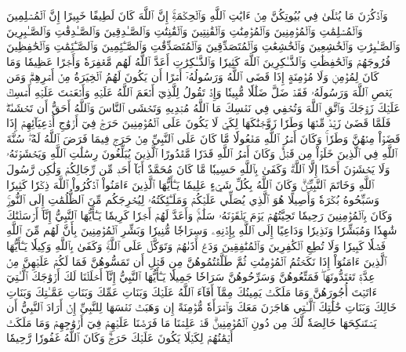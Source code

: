 وَٱذۡكُرۡنَ مَا يُتۡلَىٰ فِي بُيُوتِكُنَّ مِنۡ ءَايَٰتِ ٱللَّهِ وَٱلۡحِكۡمَةِۚ إِنَّ ٱللَّهَ كَانَ لَطِيفًا خَبِيرًا
إِنَّ ٱلۡمُسۡلِمِينَ وَٱلۡمُسۡلِمَٰتِ وَٱلۡمُؤۡمِنِينَ وَٱلۡمُؤۡمِنَٰتِ وَٱلۡقَٰنِتِينَ وَٱلۡقَٰنِتَٰتِ وَٱلصَّـٰدِقِينَ وَٱلصَّـٰدِقَٰتِ وَٱلصَّـٰبِرِينَ وَٱلصَّـٰبِرَٰتِ وَٱلۡخَٰشِعِينَ وَٱلۡخَٰشِعَٰتِ وَٱلۡمُتَصَدِّقِينَ وَٱلۡمُتَصَدِّقَٰتِ وَٱلصَّـٰٓئِمِينَ وَٱلصَّـٰٓئِمَٰتِ وَٱلۡحَٰفِظِينَ فُرُوجَهُمۡ وَٱلۡحَٰفِظَٰتِ وَٱلذَّـٰكِرِينَ ٱللَّهَ كَثِيرٗا وَٱلذَّـٰكِرَٰتِ أَعَدَّ ٱللَّهُ لَهُم مَّغۡفِرَةٗ وَأَجۡرًا عَظِيمٗا
وَمَا كَانَ لِمُؤۡمِنٖ وَلَا مُؤۡمِنَةٍ إِذَا قَضَى ٱللَّهُ وَرَسُولُهُۥٓ أَمۡرًا أَن يَكُونَ لَهُمُ ٱلۡخِيَرَةُ مِنۡ أَمۡرِهِمۡۗ وَمَن يَعۡصِ ٱللَّهَ وَرَسُولَهُۥ فَقَدۡ ضَلَّ ضَلَٰلٗا مُّبِينٗا
وَإِذۡ تَقُولُ لِلَّذِيٓ أَنۡعَمَ ٱللَّهُ عَلَيۡهِ وَأَنۡعَمۡتَ عَلَيۡهِ أَمۡسِكۡ عَلَيۡكَ زَوۡجَكَ وَٱتَّقِ ٱللَّهَ وَتُخۡفِي فِي نَفۡسِكَ مَا ٱللَّهُ مُبۡدِيهِ وَتَخۡشَى ٱلنَّاسَ وَٱللَّهُ أَحَقُّ أَن تَخۡشَىٰهُۖ فَلَمَّا قَضَىٰ زَيۡدٞ مِّنۡهَا وَطَرٗا زَوَّجۡنَٰكَهَا لِكَيۡ لَا يَكُونَ عَلَى ٱلۡمُؤۡمِنِينَ حَرَجٞ فِيٓ أَزۡوَٰجِ أَدۡعِيَآئِهِمۡ إِذَا قَضَوۡاْ مِنۡهُنَّ وَطَرٗاۚ وَكَانَ أَمۡرُ ٱللَّهِ مَفۡعُولٗا
مَّا كَانَ عَلَى ٱلنَّبِيِّ مِنۡ حَرَجٖ فِيمَا فَرَضَ ٱللَّهُ لَهُۥۖ سُنَّةَ ٱللَّهِ فِي ٱلَّذِينَ خَلَوۡاْ مِن قَبۡلُۚ وَكَانَ أَمۡرُ ٱللَّهِ قَدَرٗا مَّقۡدُورًا
ٱلَّذِينَ يُبَلِّغُونَ رِسَٰلَٰتِ ٱللَّهِ وَيَخۡشَوۡنَهُۥ وَلَا يَخۡشَوۡنَ أَحَدًا إِلَّا ٱللَّهَۗ وَكَفَىٰ بِٱللَّهِ حَسِيبٗا
مَّا كَانَ مُحَمَّدٌ أَبَآ أَحَدٖ مِّن رِّجَالِكُمۡ وَلَٰكِن رَّسُولَ ٱللَّهِ وَخَاتَمَ ٱلنَّبِيِّـۧنَۗ وَكَانَ ٱللَّهُ بِكُلِّ شَيۡءٍ عَلِيمٗا
يَـٰٓأَيُّهَا ٱلَّذِينَ ءَامَنُواْ ٱذۡكُرُواْ ٱللَّهَ ذِكۡرٗا كَثِيرٗا
وَسَبِّحُوهُ بُكۡرَةٗ وَأَصِيلًا
هُوَ ٱلَّذِي يُصَلِّي عَلَيۡكُمۡ وَمَلَـٰٓئِكَتُهُۥ لِيُخۡرِجَكُم مِّنَ ٱلظُّلُمَٰتِ إِلَى ٱلنُّورِۚ وَكَانَ بِٱلۡمُؤۡمِنِينَ رَحِيمٗا
تَحِيَّتُهُمۡ يَوۡمَ يَلۡقَوۡنَهُۥ سَلَٰمٞۚ وَأَعَدَّ لَهُمۡ أَجۡرٗا كَرِيمٗا
يَـٰٓأَيُّهَا ٱلنَّبِيُّ إِنَّآ أَرۡسَلۡنَٰكَ شَٰهِدٗا وَمُبَشِّرٗا وَنَذِيرٗا
وَدَاعِيًا إِلَى ٱللَّهِ بِإِذۡنِهِۦ وَسِرَاجٗا مُّنِيرٗا
وَبَشِّرِ ٱلۡمُؤۡمِنِينَ بِأَنَّ لَهُم مِّنَ ٱللَّهِ فَضۡلٗا كَبِيرٗا
وَلَا تُطِعِ ٱلۡكَٰفِرِينَ وَٱلۡمُنَٰفِقِينَ وَدَعۡ أَذَىٰهُمۡ وَتَوَكَّلۡ عَلَى ٱللَّهِۚ وَكَفَىٰ بِٱللَّهِ وَكِيلٗا
يَـٰٓأَيُّهَا ٱلَّذِينَ ءَامَنُوٓاْ إِذَا نَكَحۡتُمُ ٱلۡمُؤۡمِنَٰتِ ثُمَّ طَلَّقۡتُمُوهُنَّ مِن قَبۡلِ أَن تَمَسُّوهُنَّ فَمَا لَكُمۡ عَلَيۡهِنَّ مِنۡ عِدَّةٖ تَعۡتَدُّونَهَاۖ فَمَتِّعُوهُنَّ وَسَرِّحُوهُنَّ سَرَاحٗا جَمِيلٗا
يَـٰٓأَيُّهَا ٱلنَّبِيُّ إِنَّآ أَحۡلَلۡنَا لَكَ أَزۡوَٰجَكَ ٱلَّـٰتِيٓ ءَاتَيۡتَ أُجُورَهُنَّ وَمَا مَلَكَتۡ يَمِينُكَ مِمَّآ أَفَآءَ ٱللَّهُ عَلَيۡكَ وَبَنَاتِ عَمِّكَ وَبَنَاتِ عَمَّـٰتِكَ وَبَنَاتِ خَالِكَ وَبَنَاتِ خَٰلَٰتِكَ ٱلَّـٰتِي هَاجَرۡنَ مَعَكَ وَٱمۡرَأَةٗ مُّؤۡمِنَةً إِن وَهَبَتۡ نَفۡسَهَا لِلنَّبِيِّ إِنۡ أَرَادَ ٱلنَّبِيُّ أَن يَسۡتَنكِحَهَا خَالِصَةٗ لَّكَ مِن دُونِ ٱلۡمُؤۡمِنِينَۗ قَدۡ عَلِمۡنَا مَا فَرَضۡنَا عَلَيۡهِمۡ فِيٓ أَزۡوَٰجِهِمۡ وَمَا مَلَكَتۡ أَيۡمَٰنُهُمۡ لِكَيۡلَا يَكُونَ عَلَيۡكَ حَرَجٞۗ وَكَانَ ٱللَّهُ غَفُورٗا رَّحِيمٗا
